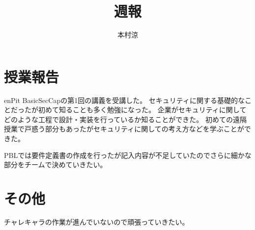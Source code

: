 \documentclass{ jsarticle }
\begin{document}
    \title{週報}
    \author{本村涼}

    \maketitle

    \section{授業報告}
    enPit BasicSecCapの第1回の講義を受講した。
    セキュリティに関する基礎的なことだったが初めて知ることも多く勉強になった。
    企業がセキュリティに関してどのような工程で設計・実装を行っているか知ることができた。
    初めての遠隔授業で戸惑う部分もあったがセキュリティに関しての考え方などを学ぶことができた。

    PBLでは要件定義書の作成を行ったが記入内容が不足していたのでさらに細かな部分をチームで決めていきたい。

    \section{その他}
    チャレキャラの作業が進んでいないので頑張っていきたい。


    
\end{document}
